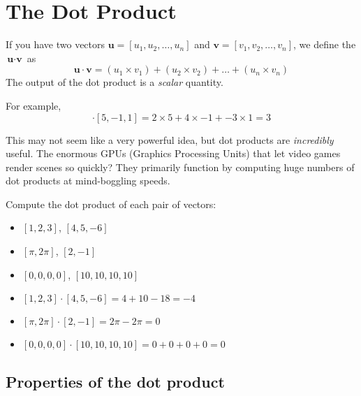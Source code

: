 \chapter{The Dot Product}

If you have two vectors $\textbf{u} = [u_1, u_2, \dots, u_n]$ and $\textbf{v} 
= [v_1, v_2,\dots, v_n]$, we define the  $\textbf{u} 
\cdot \textbf{v}$ as 
\begin{equation*}
     \textbf{u} \cdot \textbf{v} = (u_1 \times v_1) + (u_2 \times v_2) + \dots 
     + (u_n \times v_n)
\end{equation*} 
The output of the dot product is a \emph{scalar} quantity.


For example, 
\begin{equation*}
    [2,4, -3] \cdot [5, -1, 1] = 2 \times 5 + 4 \times -1 + -3 \times 1 = 3
\end{equation*}

This may not seem like a very powerful idea, but dot products are 
\emph{incredibly} useful. The enormous GPUs (Graphics Processing Units) that 
let video games render scenes so quickly? They primarily function by computing 
huge numbers of dot products at mind-boggling speeds. 

\begin{Exercise}[title={Basic dot products}, label=dot_products]
    Compute the dot product of each pair of vectors:
    \begin{itemize}
        \item $[1, 2, 3]$, $[4, 5, -6]$
        \item $[\pi, 2\pi]$, $[2, -1]$
        \item $[0,0,0,0]$, $[10,10,10,10]$
    \end{itemize}
\end{Exercise}
\begin{Answer}[ref=dot_products]
        \begin{itemize}
            \item $[1, 2, 3] \cdot [4, 5, -6] = 4 + 10 - 18 = -4$
            \item $[\pi, 2\pi] \cdot [2, -1] = 2\pi - 2\pi = 0$
            \item $[0,0,0,0] \cdot [10,10,10,10] = 0 + 0 + 0 + 0 = 0$ 
        \end{itemize}
\end{Answer}

\section{Properties of the dot product}

